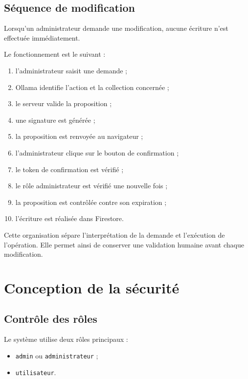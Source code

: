 \documentclass{rapportENSIAS}
\begin{document}
\subsection{Séquence de modification}

Lorsqu’un administrateur demande une modification, aucune écriture n’est effectuée immédiatement.

Le fonctionnement est le suivant :

\begin{enumerate}
    \item l’administrateur saisit une demande ;
    \item Ollama identifie l’action et la collection concernée ;
    \item le serveur valide la proposition ;
    \item une signature est générée ;
    \item la proposition est renvoyée au navigateur ;
    \item l’administrateur clique sur le bouton de confirmation ;
    \item le token de confirmation est vérifié ;
    \item le rôle administrateur est vérifié une nouvelle fois ;
    \item la proposition est contrôlée contre son expiration ;
    \item l’écriture est réalisée dans Firestore.
\end{enumerate}

Cette organisation sépare l’interprétation de la demande et l’exécution de l’opération. Elle permet ainsi de conserver une validation humaine avant chaque modification.

\section{Conception de la sécurité}

\subsection{Contrôle des rôles}

Le système utilise deux rôles principaux :

\begin{itemize}
    \item \texttt{admin} ou \texttt{administrateur} ;
    \item \texttt{utilisateur}.
\end{itemize}
\end{document}
